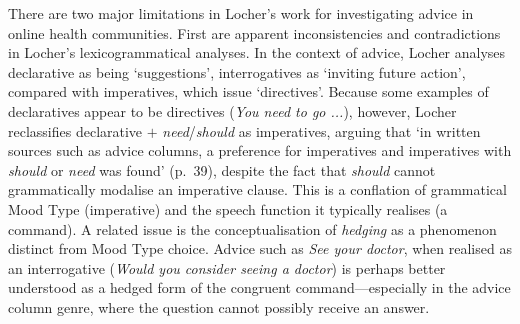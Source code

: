 
There are two major limitations in Locher's work for investigating advice in online health communities. First are apparent inconsistencies and contradictions in Locher's lexicogrammatical analyses. In the context of advice, Locher analyses declarative as being `suggestions', interrogatives as `inviting future action', compared with imperatives, which issue `directives'. Because some examples of declaratives appear to be directives (\emph{You need to go ...}), however, Locher reclassifies declarative $+$ \emph{need}\slash \emph{should} as imperatives, arguing that `in written sources such as advice columns, a preference for imperatives and imperatives with \emph{should} or \emph{need} was found' (p.~39), despite the fact that \emph{should} cannot grammatically modalise an imperative clause. This is a conflation of grammatical Mood Type (imperative) and the speech function it typically realises (a command). A related issue is the conceptualisation of \emph{hedging} as a phenomenon distinct from Mood Type choice. Advice such as \emph{See your doctor}, when realised as an interrogative (\emph{Would you consider seeing a doctor}) is perhaps better understood as a hedged form of the congruent command---especially in the advice column genre, where the question cannot possibly receive an answer.


